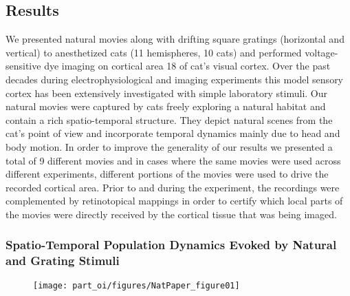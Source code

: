 
\subsection{Results} 

We presented natural movies along with drifting square gratings (horizontal
and vertical) to anesthetized cats (11 hemispheres, 10 cats) and performed
voltage-sensitive dye imaging on cortical area 18 of cat's visual cortex.
Over the past decades during electrophysiological and imaging experiments
this model sensory cortex has been extensively investigated with simple
laboratory stimuli. Our natural movies were captured by cats freely
exploring a natural habitat and contain a rich spatio-temporal structure.
They depict natural scenes from the cat's point of view and incorporate
temporal dynamics mainly due to head and body motion.  In order to improve
the generality of our results we presented a total of 9 different movies
and in cases where the same movies were used across different experiments,
different portions of the movies were used to drive the recorded cortical
area. Prior to and during the experiment, the recordings were complemented
by retinotopical mappings in order to certify which local parts of the
movies were directly received by the cortical tissue that was being imaged.


\subsubsection{Spatio-Temporal Population Dynamics Evoked by Natural and
Grating Stimuli} 

\label{oi_raw}

\begin{figure}
\texttt{[image: part\_oi/figures/NatPaper\_figure01]}
 
\caption[Recording Cortical Responses to Natural Stimuli and Gratings.]
{ \protect}
\label{np1}
\end{figure} 





